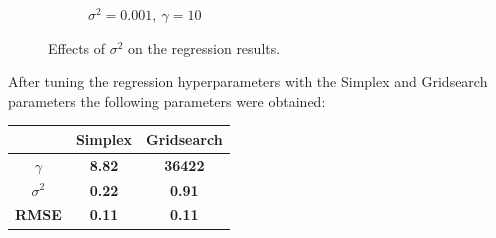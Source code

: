 \documentclass{article}
\begin{document}
\begin{figure}[h]
\begin{subfigure}[b]{0.4\textwidth}
                     \caption{$\sigma^2=0.001,\ \gamma=10$}
                     \label{fig:low_sigma}
                 \end{subfigure}
                \hspace{0.05\textwidth}
                \caption{Effects of $\sigma^2$ on the regression results.}
            \end{figure}
            
            After tuning the regression hyperparameters with the Simplex and Gridsearch parameters the following parameters were obtained: 
            \begin{table}[H]
            \centering
            \begin{tabular}{|c|c|c|}
            \hline
            \textbf{}           & \textbf{Simplex} & \textbf{Gridsearch} \\ \hline
            \textbf{$\gamma$}   & \textbf{8.82}    & \textbf{36422}      \\ \hline
            \textbf{$\sigma^2$} & \textbf{0.22}    & \textbf{0.91}       \\ \hline
            \textbf{RMSE}       & \textbf{0.11}    & \textbf{0.11}       \\ \hline
            \end{tabular}
            \end{table}
            
\end{document}
